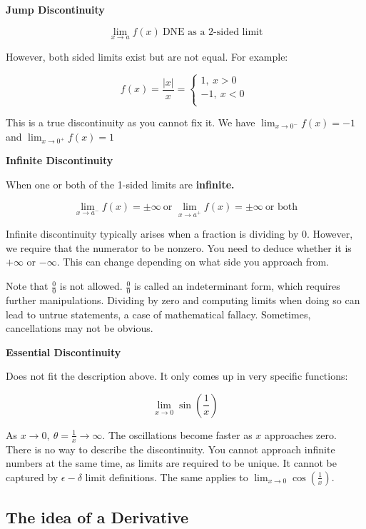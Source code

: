 \documentclass[12pt]{article}
\theoremstyle{plain}
\theoremstyle{remark}
\theoremstyle{definition}
\begin{document}
\textbf{Jump Discontinuity}

\[\lim_{x \rightarrow a}{f(x)}\ \text{DNE\ as\ a\ 2-sided\ limit}\]

However, both sided limits exist but are not equal. For example:

\[f(x) = \frac{|x|}{x} = \left\{ \begin{matrix}
1,\ x > 0 \\
 - 1,\ x < 0 \\
\end{matrix} \right.\ \]

This is a true discontinuity as you cannot fix it. We have
\(\lim_{x \rightarrow 0^{-}}{f(x) = - 1}\) and
\(\lim_{x \rightarrow 0^{+}}{f(x) = 1}\)

\textbf{Infinite Discontinuity}

When one or both of the 1-sided limits are \textbf{infinite.}

\[\lim_{x \rightarrow a^{-}}{f(x) = \pm \infty}\ \text{or\ }\lim_{x \rightarrow a^{+}}{f(x) = \pm \infty}\ \text{or\ both}\]

Infinite discontinuity typically arises when a fraction is dividing by
0. However, we require that the numerator to be nonzero. You need to
deduce whether it is \(+ \infty\) or \(- \infty\). This can change
depending on what side you approach from.

Note that \(\frac{0}{0}\) is not allowed. \(\frac{0}{0}\) is called an
indeterminant form, which requires further manipulations. Dividing by
zero and computing limits when doing so can lead to untrue statements, a
case of mathematical fallacy. Sometimes, cancellations may not be
obvious.

\textbf{Essential Discontinuity}

Does not fit the description above. It only comes up in very specific
functions:

\[\lim_{x \rightarrow 0}{\sin\left( \frac{1}{x} \right)}\]

As \(x \rightarrow 0,\ \theta = \frac{1}{x} \rightarrow \infty\). The
oscillations become faster as \(x\) approaches zero. There is no way to
describe the discontinuity. You cannot approach infinite numbers at the
same time, as limits are required to be unique. It cannot be captured by
\(\epsilon - \delta\) limit definitions. The same applies to
\(\lim_{x \rightarrow 0}{\cos\left( \frac{1}{x} \right)}\).


\subsection{The idea of a Derivative}
\end{document}
